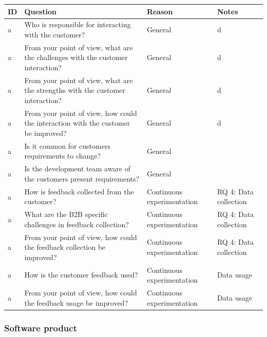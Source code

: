 \documentclass[english]{tktltiki2}
\theoremstyle{definition}
\theoremstyle{remark}
\begin{document}
\begin{center}
    \begin{tabular}{ | l | l | l | p{5cm} |}
    \hline
    ID & Question & Reason & Notes \\ \hline
    a & Who is responsible for interacting with the customer? & General & d \\ \hline
    a & From your point of view, what are the challenges with the customer interaction? & General & d \\ \hline
    a & From your point of view, what are the strengths with the customer interaction? & General & d \\ \hline
    a & From your point of view, how could the interaction with the customer be improved? & General & d \\ \hline
	a & Is it common for customers requirements to change? & General &  \\ \hline
    a & Is the development team aware of the customers present requirements? & General &  \\ \hline

	a & How is feedback collected from the customer? & Continuous experimentation & RQ 4: Data collection \\ \hline
	a & What are the B2B specific challenges in feedback collection? & Continuous experimentation & RQ 4: Data collection \\ \hline
	a & From your point of view, how could the feedback collection be improved? & Continuous experimentation & RQ 4: Data collection \\ \hline
	a & How is the customer feedback used? & Continuous experimentation & Data usage \\ \hline	
	a & From your point of view, how could the feedback usage be improved? & Continuous experimentation & Data usage \\ \hline

    \hline
    \end{tabular}
\end{center}

\subsubsection{Software product}
\end{document}

